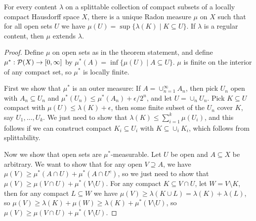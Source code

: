 \begin{thm}\label{content-measure} For every content $\lambda$ on a splittable collection of compact subsets of a locally compact Hausdorff space $X$, there is a unique Radon measure $\mu$ on $X$ such that for all open sets $U$ we have $\mu(U) = \sup\{\lambda(K) \mid K \subseteq U\}$. If $\lambda$ is a regular content, then $\mu$ extends $\lambda$.
\end{thm}
\begin{proof} Define $\mu$ on open sets as in the theorem statement, and define $\mu^* : \mathcal{P}(X) \rightarrow [0,\infty]$ by $\mu^*(A) = \inf \{\mu(U) \mid A \subseteq U\}$. $\mu$ is finite on the interior of any compact set, so $\mu^*$ is locally finite.

First we show that $\mu^*$ is an outer measure: If $A = \cup_{n=1}^\infty A_n$, then pick $U_n$ open with $A_n \subseteq U_n$ and $\mu^*(U_n) \le \mu^*(A_n) + \epsilon/2^n$, and let $U = \cup_n U_n$. Pick $K \subseteq U$ compact with $\mu(U) \le \lambda(K) + \epsilon$, then some finite subset of the $U_n$ cover $K$, say $U_1, ..., U_k$. We just need to show that $\lambda(K) \le \sum_{i=1}^k \mu(U_i)$, and this follows if we can construct compact $K_i \subseteq U_i$ with $K \subseteq \cup_i K_i$, which follows from splittability.

Now we show that open sets are $\mu^*$-measurable. Let $U$ be open and $A\subseteq X$ be arbitrary. We want to show that for any open $V \supseteq A$, we have $\mu(V) \ge \mu^*(A\cap U) + \mu^*(A\cap U^c)$, so we just need to show that $\mu(V) \ge \mu(V\cap U) + \mu^*(V\setminus U)$. For any compact $K \subseteq V\cap U$, let $W = V \setminus K$, then for any compact $L \subseteq W$ we have $\mu(V) \ge \lambda(K\cup L) = \lambda(K) + \lambda(L)$, so $\mu(V) \ge \lambda(K) + \mu(W) \ge \lambda(K) + \mu^*(V\setminus U)$, so $\mu(V) \ge \mu(V\cap U) + \mu^*(V\setminus U)$.
\end{proof}


